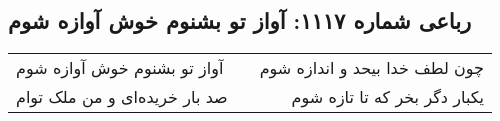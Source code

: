 \begin{center}
\section*{رباعی شماره ۱۱۱۷: آواز تو بشنوم خوش آوازه شوم}
\label{sec:1117}
\begin{longtable}{l p{0.5cm} r}
آواز تو بشنوم خوش آوازه شوم
&&
چون لطف خدا بیحد و اندازه شوم
\\
صد بار خریده‌ای و من ملک توام
&&
یکبار دگر بخر که تا تازه شوم
\\
\end{longtable}
\end{center}
